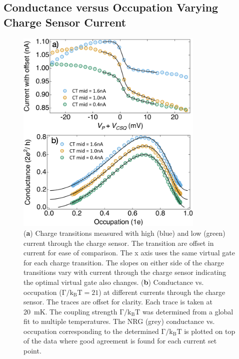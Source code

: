 \subsection{Conductance versus Occupation Varying Charge Sensor Current}



\begin{figure}[!bht]
  \begin{center}
    \includegraphics[width=0.8\textwidth]{figures/ch3/crop_FiguresMaster.017.png}
    \caption[Conductance vs. Occupation : Varying the current through the charge sensor]{\label{fig:ch3/cond_occ_QPC_vs_ct} 
    (\textbf{a}) Charge transitions measured with high (blue) and low (green) current through the charge sensor. The transition are offset in current for ease of comparison. The x axis uses the same virtual gate for each charge transition. The slopes on either side of the charge transitions vary with current through the charge sensor indicating the optimal virtual gate also changes. (\textbf{b}) Conductance vs. occupation ($\mathrm{\Gamma/k_BT=21}$) at different currents through the charge sensor. The traces are offset for clarity. Each trace is taken at \qty{20}{mK}. The coupling strength $\mathrm{\Gamma/k_BT}$ was determined from a global fit to multiple temperatures. The NRG (grey) conductance vs. occupation corresponding to the determined $\mathrm{\Gamma/k_BT}$ is plotted on top of the data where good agreement is found for each current set point.}
  \end{center}
\end{figure}


